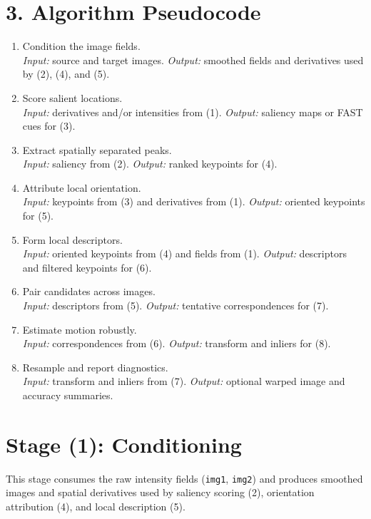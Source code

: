 \documentclass[11pt]{article}
\begin{document}
\section*{3. Algorithm Pseudocode}
\begin{enumerate}[label=(\arabic*), leftmargin=*]
  \item Condition the image fields. \\
  \emph{Input:} source and target images. \emph{Output:} smoothed fields and derivatives used by (2), (4), and (5).

  \item Score salient locations. \\
  \emph{Input:} derivatives and/or intensities from (1). \emph{Output:} saliency maps or FAST cues for (3).

  \item Extract spatially separated peaks. \\
  \emph{Input:} saliency from (2). \emph{Output:} ranked keypoints for (4).

  \item Attribute local orientation. \\
  \emph{Input:} keypoints from (3) and derivatives from (1). \emph{Output:} oriented keypoints for (5).

  \item Form local descriptors. \\
  \emph{Input:} oriented keypoints from (4) and fields from (1). \emph{Output:} descriptors and filtered keypoints for (6).

  \item Pair candidates across images. \\
  \emph{Input:} descriptors from (5). \emph{Output:} tentative correspondences for (7).

  \item Estimate motion robustly. \\
  \emph{Input:} correspondences from (6). \emph{Output:} transform and inliers for (8).

  \item Resample and report diagnostics. \\
  \emph{Input:} transform and inliers from (7). \emph{Output:} optional warped image and accuracy summaries.
\end{enumerate}

\section*{Stage (1): Conditioning}
This stage consumes the raw intensity fields (\texttt{img1}, \texttt{img2}) and produces smoothed images and spatial derivatives used by saliency scoring (2), orientation attribution (4), and local description (5).
\end{document}
